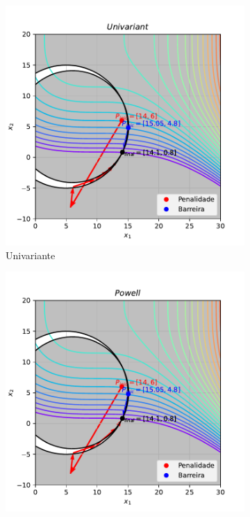\documentclass[10pt, a4paper]{article}
\begin{document}
\begin{figure}[htpb]
  \centering
  \begin{subfigure}[b]{0.32\textwidth}
      \centering
      \includegraphics[width=\textwidth]{images/q3_Univariant.pdf}
      \caption{Univariante}
      \label{fig:q3_univariant}
  \end{subfigure}
  \hfill
  \begin{subfigure}[b]{0.32\textwidth}
    \centering
    \includegraphics[width=\textwidth]{images/q3_Powell.pdf}

\end{subfigure}
\end{figure}
\end{document}
